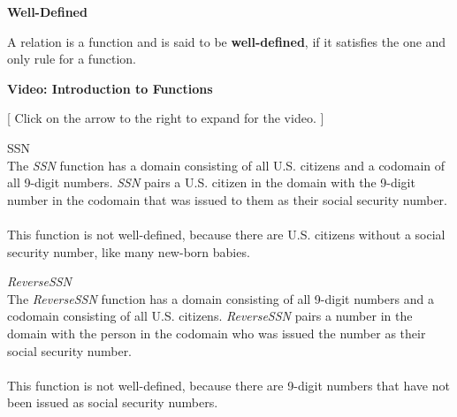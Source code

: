 \documentclass{ximera}
\begin{document}
\begin{definition} \textbf{\textcolor{green!50!black}{Well-Defined}}

A relation is a function and is said to be \textbf{well-defined}, if it satisfies the one and only rule for a function.
\end{definition}













\begin{explanation} \textbf{Video: Introduction to Functions}

[ Click on the arrow to the right to expand for the video. ]
\begin{expandable} 

\begin{center}
\end{center}

\end{expandable}
\end{explanation}






\begin{example} SSN \\
The \textit{SSN} function has a domain consisting of all U.S. citizens and a codomain of all 9-digit numbers.  \textit{SSN} pairs a U.S. citizen in the domain with the 9-digit number in the codomain that was issued to them as their social security number. 
\\ \\ 
This function is not well-defined, because there are U.S. citizens without a social security number, like many new-born babies.
\end{example}


\begin{example} \textit{ReverseSSN} \\
The \textit{ReverseSSN} function has a domain consisting of all 9-digit numbers and a codomain consisting of all U.S. citizens.  \textit{ReverseSSN} pairs a number in the domain with the person in the codomain who was issued the number as their social security number. 
\\ \\ 
This function is not well-defined, because there are 9-digit numbers that have not been issued as social security numbers.
\end{example}
\end{document}
